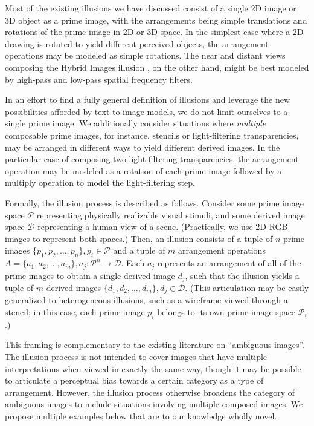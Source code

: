 Most of the existing illusions we have discussed consist of a single 2D image or 3D object as a prime image, with the arrangements being simple translations and rotations of the prime image in 2D or 3D space. In the simplest case where a 2D drawing is rotated to yield different perceived objects, the arrangement operations may be modeled as simple rotations. The near and distant views composing the Hybrid Images illusion \cite{oliva2006hybrid}, on the other hand, might be best modeled by high-pass and low-pass spatial frequency filters.

In an effort to find a fully general definition of illusions and leverage the new possibilities afforded by text-to-image models, we do not limit ourselves to a single prime image.
We additionally consider situations where \textit{multiple} composable prime images, for instance, stencils or light-filtering transparencies, may be arranged in different ways to yield different derived images. In the particular case of composing two light-filtering transparencies, the arrangement operation may be modeled as a rotation of each prime image followed by a multiply operation to model the light-filtering step.

Formally, the illusion process is described as follows. Consider some prime image space $\mathcal{P}$ representing physically realizable visual stimuli, and some derived image space $\mathcal{D}$ representing a human view of a scene. (Practically, we use 2D RGB images to represent both spaces.) Then, an illusion consists of a tuple of $n$ prime images $\{p_1, p_2, \ldots, p_n\}, p_i \in \mathcal{P}$ and a tuple of $m$ arrangement operations $A = \{a_1, a_2, \ldots, a_m\}, a_j : \mathcal{P}^n \rightarrow \mathcal{D}$. Each $a_j$ represents an arrangement of all of the prime images to obtain a single derived image $d_j$, such that the illusion yields a tuple of $m$ derived images $\{d_1, d_2, \ldots, d_m\}, d_j \in \mathcal{D}$. (This articulation may be easily generalized to heterogeneous illusions, such as a wireframe viewed through a stencil; in this case, each prime image $p_i$ belongs to its own prime image space $\mathcal{P}_i$.)

This framing is complementary to the existing literature on ``ambiguous images''. The illusion process is not intended to cover images that have multiple interpretations when viewed in exactly the same way, though it may be possible to articulate a perceptual bias towards a certain category as a type of arrangement. However, the illusion process otherwise broadens the category of ambiguous images to include situations involving multiple composed images. We propose multiple examples below that are to our knowledge wholly novel.

